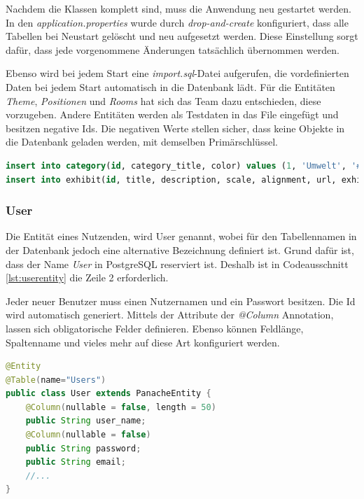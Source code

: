 Nachdem die Klassen komplett sind, muss die Anwendung neu gestartet werden. 
In den \emph{application.properties} wurde durch \emph{drop-and-create} konfiguriert, dass alle Tabellen bei Neustart gelöscht und neu aufgesetzt werden. 
Diese Einstellung sorgt dafür, dass jede vorgenommene Änderungen tatsächlich übernommen werden. 

Ebenso wird bei jedem Start eine \emph{import.sql}-Datei aufgerufen, die vordefinierten Daten bei jedem Start automatisch in die Datenbank lädt.  
Für die Entitäten \emph{Theme}, \emph{Positionen} und \emph{Rooms} hat sich das Team dazu entschieden, diese vorzugeben. 
Andere Entitäten werden als Testdaten in das File eingefügt und besitzen negative Ids. 
Die negativen Werte stellen sicher, dass keine Objekte in die Datenbank geladen werden, mit demselben Primärschlüssel.

\begin{lstlisting}[label=lst:importsql, language=sql, caption=Ausschnitt import.sql]
insert into category(id, category_title, color) values (1, 'Umwelt', '#C1BAFF'), (2, 'Tiere', '#ADD0FF');
insert into exhibit(id, title, description, scale, alignment, url, exhibition_id, position_id, data_type) values (-20, 'Art Blob', 'Sculpture made by Lorenz Litzlanze', 40, 'c', 'example-exhibits/abstraktArtBlob.gltf', -3, 2, 'gltf');
\end{lstlisting}

\subsubsection{User}
Die Entität eines Nutzenden, wird User genannt, wobei für den Tabellennamen in der Datenbank jedoch eine alternative Bezeichnung definiert ist.
Grund dafür ist, dass der Name \emph{User} in PostgreSQL reserviert ist. 
Deshalb ist in Codeausschnitt \ref{lst:userentity} die Zeile 2 erforderlich.

Jeder neuer Benutzer muss einen Nutzernamen und ein Passwort besitzen. 
Die Id wird automatisch generiert. 
Mittels der Attribute der \emph{@Column} Annotation, lassen sich obligatorische Felder definieren.
Ebenso können Feldlänge, Spaltenname und vieles mehr auf diese Art konfiguriert werden.

\begin{lstlisting}[label=lst:userentity, language=Java, caption=Teil der Entity-Klasse des Users]
@Entity
@Table(name="Users")        
public class User extends PanacheEntity {
    @Column(nullable = false, length = 50)
    public String user_name;
    @Column(nullable = false)
    public String password;
    public String email;
    //...
}
\end{lstlisting}

